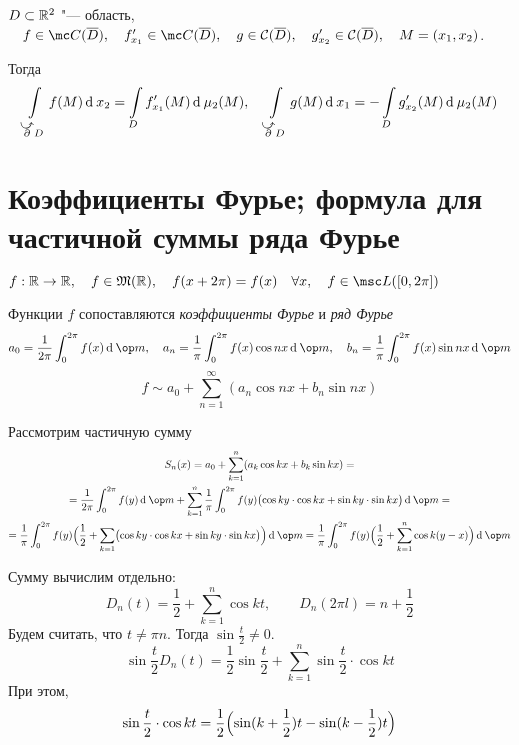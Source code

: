 \begin{theorem}
	$ D \subset \mathbb{R}^2 $ "--- область, $ \quad f \in \mc C(\ol D), \quad f_{x_1}' \in \mc C(\ol D), \quad g \in \mathcal C(\ol D), \quad g_{x_2}' \in \mathcal C(\ol D), \quad M = (x_1, x_2) $.

	Тогда
	$$ \int\limits_{\curvedir \partial D} f(M) \di x_2 = \int\limits_D f_{x_1}'(M) \di \mu_2(M), \quad \int\limits_{\curvedir \partial D} g(M) \di x_1 = - \int\limits_D g_{x_2}'(M) \di \mu_2(M) $$
\end{theorem}

\section{Коэффициенты Фурье; формула для частичной суммы ряда Фурье}

\begin{definition}
	$ f : \R \to \R, \quad f \in \mathfrak M(\R), \quad f(x + 2\pi) = f(x) \quad \forall x, \quad f \in \msc L([0, 2\pi]) $

	Функции $ f $ сопоставляются \emph{коэффициенты Фурье} и \emph{ряд Фурье}
	$$ a_0 = \frac1{2\pi} \int_0^{2\pi} f(x) \di \op m, \quad a_n = \frac1\pi \int_0^{2\pi} f(x) \cos n x \di \op m, \quad b_n = \frac1\pi \int_0^{2\pi} f(x) \sin nx \di \op m $$
	$$ f \sim a_0 + \sum_{n = 1}^\infty (a_n \cos nx + b_n \sin nx) $$
\end{definition}

Рассмотрим частичную сумму
\begin{multline*}
	S_n(x) = a_0 + \sum_{k = 1}^n (a_k \cos kx + b_k \sin kx) = \\
	= \frac1{2\pi} \int_0^{2\pi} f(y) \di \op m + \sum_{k = 1}^n \frac1\pi \int_0^{2\pi} f(y) \bigl( \cos ky \cdot \cos kx + \sin ky \cdot \sin kx \bigr) \di \op m = \\
	= \frac1\pi \int_0^{2\pi} f(y) \Bigl( \frac12 + \sum_{k = 1} \bigl( \cos ky \cdot \cos kx + \sin ky \cdot \sin kx \bigr) \Bigr) \di \op m =
	\frac1\pi \int_0^{2\pi} f(y) \Bigl( \frac12 + \sum_{k = 1}^n \cos k(y - x) \Bigr) \di \op m
\end{multline*}

Сумму вычислим отдельно:
$$ D_n(t) = \frac12 + \sum_{k = 1}^n \cos kt, \qquad D_n(2\pi l) = n + \frac12 $$
Будем считать, что $ t \ne \pi n $. Тогда $ \sin \frac t2 \ne 0 $.
$$ \sin \frac t2 D_n(t) = \frac 12 \sin \frac t2 + \sum_{k = 1}^n \sin \frac t2 \cdot \cos kt $$
При этом,
$$ \sin \frac t2 \cdot \cos kt = \frac12 \Bigl( \sin (k + \frac12) t - \sin (k - \frac12) t \Bigr) $$

